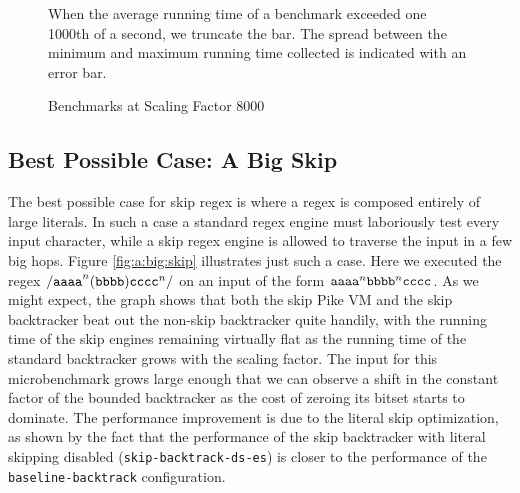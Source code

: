 \begin{figure}
\caption{Benchmarks at Scaling Factor 8000}
\label{fig:8000:all}

When the average running time of a benchmark exceeded one
1000th of a second, we truncate the bar. The spread between
the minimum and maximum running time collected is indicated
with an error bar.

\end{figure}


\subsection{Best Possible Case: A Big Skip}

The best possible case for skip regex is where a regex is composed
entirely of large literals. In such a case a standard regex engine
must laboriously test every input character, while a skip regex
engine is allowed to traverse the input in a few big hops. Figure
\ref{fig:a:big:skip} illustrates just such a case. Here we executed the
regex ${\tt /aaaa}^n{\tt (bbbb)}{\tt cccc}^n{\tt /}$ on
an input of the form ${\tt aaaa}^n{\tt bbbb}^n{\tt cccc}$.
As we might expect,
the graph shows that both the skip Pike VM and the skip backtracker
beat out the non-skip backtracker quite handily, with the running time
of the skip engines remaining virtually flat as the running
time of the standard backtracker grows with the scaling factor.
The input for this microbenchmark grows large enough that we can
observe a shift in the constant factor of the bounded backtracker
as the cost of zeroing its bitset starts to dominate.
The performance improvement is due to the literal skip
optimization, as shown by the fact that the performance of the skip
backtracker with literal skipping disabled (\verb'skip-backtrack-ds-es')
is closer to the performance of the \verb'baseline-backtrack' configuration.

